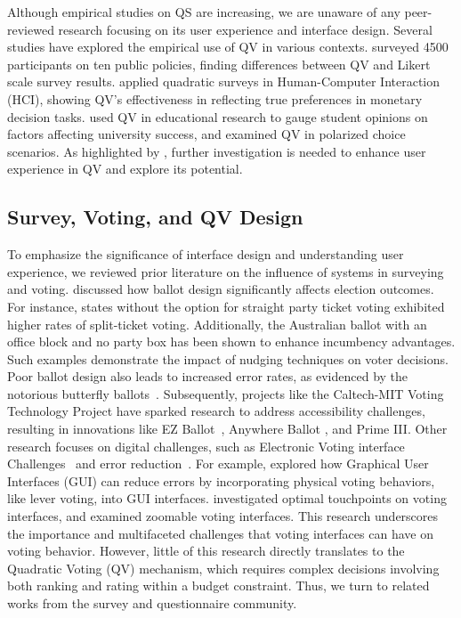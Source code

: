 Although empirical studies on QS are increasing, we are unaware of any peer-reviewed research focusing on its user experience and interface design. Several studies have explored the empirical use of QV in various contexts. \textcite{quarfoot2017quadratic} surveyed 4500 participants on ten public policies, finding differences between QV and Likert scale survey results. \textcite{chengCanShowWhat2021} applied quadratic surveys in Human-Computer Interaction (HCI), showing QV's effectiveness in reflecting true preferences in monetary decision tasks. \textcite{naylor2017first} used QV in educational research to gauge student opinions on factors affecting university success, and \textcite{cavailleWhoCaresMeasuring} examined QV in polarized choice scenarios. As highlighted by \textcite{quarfoot2017quadratic}, further investigation is needed to enhance user experience in QV and explore its potential.

\subsection{Survey, Voting, and QV Design}
To emphasize the significance of interface design and understanding user experience, we reviewed prior literature on the influence of systems in surveying and voting. \textcite{engstrom2020politics} discussed how ballot design significantly affects election outcomes. For instance, states without the option for straight party ticket voting exhibited higher rates of split-ticket voting. Additionally, the Australian ballot with an office block and no party box has been shown to enhance incumbency advantages. Such examples demonstrate the impact of nudging techniques on voter decisions. Poor ballot design also leads to increased error rates, as evidenced by the notorious butterfly ballots~\cite{wandButterflyDidIt2001}. Subsequently, projects like the Caltech-MIT Voting Technology Project have sparked research to address accessibility challenges, resulting in innovations like EZ Ballot~\cite{leeUniversalDesignBallot2016}, Anywhere Ballot \cite{summers2014making}, and Prime III\cite{dawkinsPrimeIIIInnovative2009}. Other research focuses on digital challenges, such as Electronic Voting interface Challenges~\cite{herrnsonEVALUATIONMARYLANDNEW2003} and error reduction~\cite{everettElectronicVotingMachines2008}. For example, \textcite{everettElectronicVotingMachines2008} explored how Graphical User Interfaces (GUI) can reduce errors by incorporating physical voting behaviors, like lever voting, into GUI interfaces. \textcite{gilbertAnomalyDetectionElectronic2013} investigated optimal touchpoints on voting interfaces, and \textcite{conradElectronicVotingEliminates2009} examined zoomable voting interfaces. This research underscores the importance and multifaceted challenges that voting interfaces can have on voting behavior. However, little of this research directly translates to the Quadratic Voting (QV) mechanism, which requires complex decisions involving both ranking and rating within a budget constraint. Thus, we turn to related works from the survey and questionnaire community.

